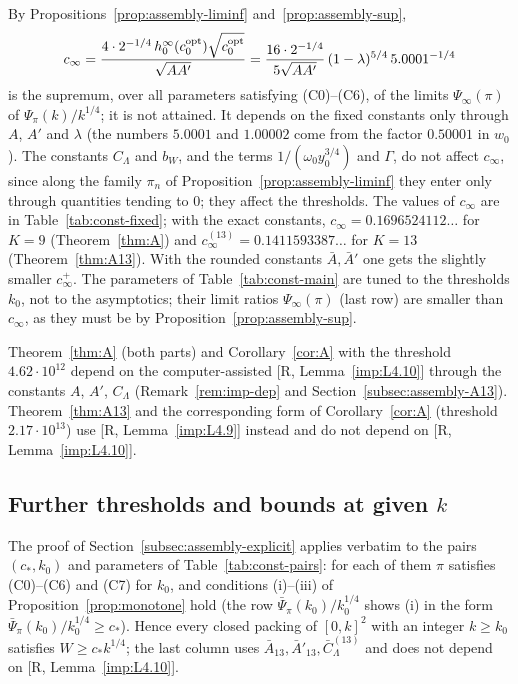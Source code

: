 \documentclass[11pt]{amsart}
\newcommand{\Lam}{\Lambda}
\theoremstyle{definition}
\theoremstyle{remark}
\numberwithin{equation}{section}
\begin{document}
By Propositions~\ref{prop:assembly-liminf} and~\ref{prop:assembly-sup},
\[
c_\infty=\frac{4\cdot2^{-1/4}\,h_0^\infty(c_0^{\rm opt})\sqrt{c_0^{\rm opt}}}{\sqrt{AA'}}
=\frac{16\cdot2^{-1/4}}{5\sqrt{AA'}}\,(1-\lambda)^{5/4}\,5.0001^{-1/4}
\]
is the supremum, over all parameters satisfying (C0)--(C6), of the limits $\Psi_\infty(\pi)$ of $\Psi_\pi(k)/k^{1/4}$;
it is not attained. It depends on the fixed constants only through $A$, $A'$ and $\lambda$ (the numbers $5.0001$ and
$1.00002$ come from the factor $0.50001$ in $w_0$). The constants $C_\Lam$ and $b_W$, and the terms
$1/(\omega_0y_0^{3/4})$ and $\Gamma$, do not affect $c_\infty$, since along the family $\pi_n$ of
Proposition~\ref{prop:assembly-liminf} they enter only through quantities tending to $0$; they affect the thresholds. The
values of $c_\infty$ are in Table~\ref{tab:const-fixed}; with the exact constants, $c_\infty=0.1696524112\ldots$ for
$K=9$ (Theorem~\ref{thm:A}) and $c_\infty^{(13)}=0.1411593387\ldots$ for $K=13$ (Theorem~\ref{thm:A13}). With the
rounded constants $\bar A,\bar A'$ one gets the slightly smaller $c_\infty^+$. The parameters of
Table~\ref{tab:const-main} are tuned to the thresholds $k_0$, not to the asymptotics; their limit ratios
$\Psi_\infty(\pi)$ (last row) are smaller than $c_\infty$, as they must be by Proposition~\ref{prop:assembly-sup}.

Theorem~\ref{thm:A} (both parts) and Corollary~\ref{cor:A} with the threshold $4.62\cdot10^{12}$ depend on the
computer-assisted [R, Lemma~\ref{imp:L4.10}] through the constants $A$, $A'$, $C_\Lam$ (Remark~\ref{rem:imp-dep} and
Section~\ref{subsec:assembly-A13}).
Theorem~\ref{thm:A13} and the corresponding form of Corollary~\ref{cor:A} (threshold $2.17\cdot10^{13}$) use
[R, Lemma~\ref{imp:L4.9}] instead and do not depend on [R, Lemma~\ref{imp:L4.10}].

\subsection{Further thresholds and bounds at given \texorpdfstring{$k$}{k}}\label{subsec:const-pairs}

The proof of Section~\ref{subsec:assembly-explicit} applies verbatim to the pairs $(c_*,k_0)$ and parameters of
Table~\ref{tab:const-pairs}: for each of them $\pi$ satisfies (C0)--(C6) and (C7) for $k_0$, and conditions
(i)--(iii) of Proposition~\ref{prop:monotone} hold (the row $\bar\Psi_\pi(k_0)/k_0^{1/4}$ shows (i) in the form
$\bar\Psi_\pi(k_0)/k_0^{1/4}\ge c_*$). Hence every closed packing of $[0,k]^2$ with an integer $k\ge k_0$ satisfies
$W\ge c_*k^{1/4}$; the last column uses $\bar A_{13},\bar A'_{13},\bar C^{(13)}_\Lam$ and does not depend on
[R, Lemma~\ref{imp:L4.10}].
\end{document}
